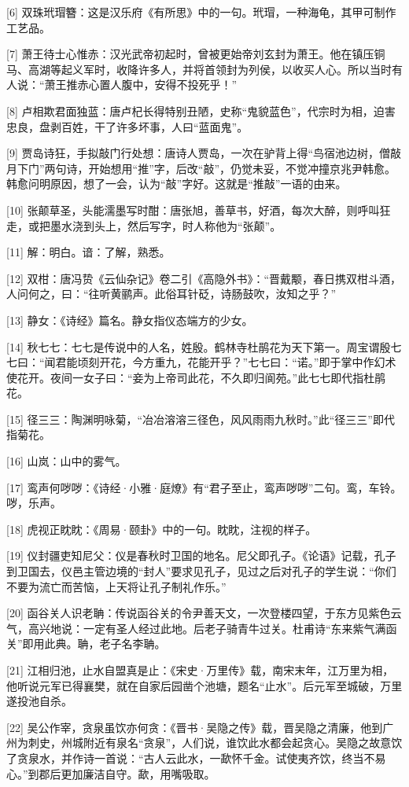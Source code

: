 \documentclass[12pt,UTF8]{ctexbook}
\begin{document}
[6] 双珠玳瑁簪：这是汉乐府《有所思》中的一句。玳瑁，一种海龟，其甲可制作工艺品。

[7] 萧王待士心惟赤：汉光武帝初起时，曾被更始帝刘玄封为萧王。他在镇压铜马、高湖等起义军时，收降许多人，并将首领封为列侯，以收买人心。所以当时有人说：“萧王推赤心置人腹中，安得不投死乎！”

[8] 卢相欺君面独蓝：唐卢杞长得特别丑陋，史称“鬼貌蓝色”，代宗时为相，迫害忠良，盘剥百姓，干了许多坏事，人曰“蓝面鬼”。

[9] 贾岛诗狂，手拟敲门行处想：唐诗人贾岛，一次在驴背上得“鸟宿池边树，僧敲月下门”两句诗，开始想用“推”字，后改“敲”，仍觉未妥，不觉冲撞京兆尹韩愈。韩愈问明原因，想了一会，认为“敲”字好。这就是“推敲”一语的由来。

[10] 张颠草圣，头能濡墨写时酣：唐张旭，善草书，好酒，每次大醉，则呼叫狂走，或把墨水浇到头上，然后写字，时人称他为“张颠”。

[11] 解：明白。谙：了解，熟悉。

[12] 双柑：唐冯贽《云仙杂记》卷二引《高隐外书》：“晋戴颙，春日携双柑斗酒，人问何之，曰：“往听黄鹂声。此俗耳针砭，诗肠鼓吹，汝知之乎？”

[13] 静女：《诗经》篇名。静女指仪态端方的少女。

[14] 秋七七：七七是传说中的人名，姓殷。鹤林寺杜鹃花为天下第一。周宝谓殷七七曰：“闻君能顷刻开花，今方重九，花能开乎？”七七曰：“诺。”即于掌中作幻术使花开。夜间一女子曰：“妾为上帝司此花，不久即归阆苑。”此七七即代指杜鹃花。

[15] 径三三：陶渊明咏菊，“冶冶溶溶三径色，风风雨雨九秋时。”此“径三三”即代指菊花。

[16] 山岚：山中的雾气。

[17] 鸾声何哕哕：《诗经·小雅·庭燎》有“君子至止，鸾声哕哕”二句。鸾，车铃。哕，乐声。

[18] 虎视正眈眈：《周易·颐卦》中的一句。眈眈，注视的样子。

[19] 仪封疆吏知尼父：仪是春秋时卫国的地名。尼父即孔子。《论语》记载，孔子到卫国去，仪邑主管边境的“封人”要求见孔子，见过之后对孔子的学生说：“你们不要为流亡而苦恼，上天将让孔子制礼作乐。”

[20] 函谷关人识老聃：传说函谷关的令尹善天文，一次登楼四望，于东方见紫色云气，高兴地说：一定有圣人经过此地。后老子骑青牛过关。杜甫诗“东来紫气满函关”即用此典。聃，老子名李聃。

[21] 江相归池，止水自盟真是止：《宋史·万里传》载，南宋末年，江万里为相，他听说元军已得襄樊，就在自家后园凿个池塘，题名“止水”。后元军至城破，万里遂投池自杀。

[22] 吴公作宰，贪泉虽饮亦何贪：《晋书·吴隐之传》载，晋吴隐之清廉，他到广州为刺史，州城附近有泉名“贪泉”，人们说，谁饮此水都会起贪心。吴隐之故意饮了贪泉水，并作诗一首说：“古人云此水，一歃怀千金。试使夷齐饮，终当不易心。”到郡后更加廉洁自守。歃，用嘴吸取。
\end{document}
